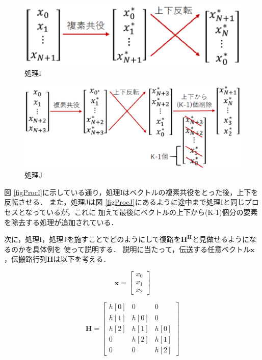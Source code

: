 \begin{figure}
    \centering
    \includegraphics[width=0.6\linewidth]{chapter3/figure/ProcI.eps}
    \caption{処理I}
    \label{figPPL}
\end{figure}
\begin{figure}
    \centering
    \includegraphics[width=0.7\linewidth]{chapter3/figure/ProcJ.eps}
    \caption{処理J}
    \label{figPPL}
\end{figure}

図 \ref{figProcI}に示している通り，処理Iはベクトルの複素共役をとった後，上下を反転させる．
また，処理Jは図 \ref{figProcJ}にあるように途中まで処理Iと同じプロセスとなっているが，これに
加えて最後にベクトルの上下から(K-1)個分の要素を除去する処理が追加されている．

次に，処理I，処理Jを施すことでどのようにして復路を$\bm{H^H}$と見做せるようになるのかを具体例を
使って説明する．
説明に当たって，伝送する任意ベクトル$\bm{x}$，伝搬路行列$\bm{H}$は以下を考える．

\begin{equation}
    \bm{x} = \left[
        \begin{array}{c}
            x_0 \\
            x_1 \\
            x_2
        \end{array}
    \right]
\end{equation}

\begin{equation}
    \bm{H} = \left[
        \begin{array}{ccc}
            h[0] & 0 & 0 \\
            h[1] & h[0] & 0 \\
            h[2] & h[1] & h[0] \\
            0 & h[2] & h[1] \\
            0 & 0 & h[2]
        \end{array}
    \right]
\end{equation}

